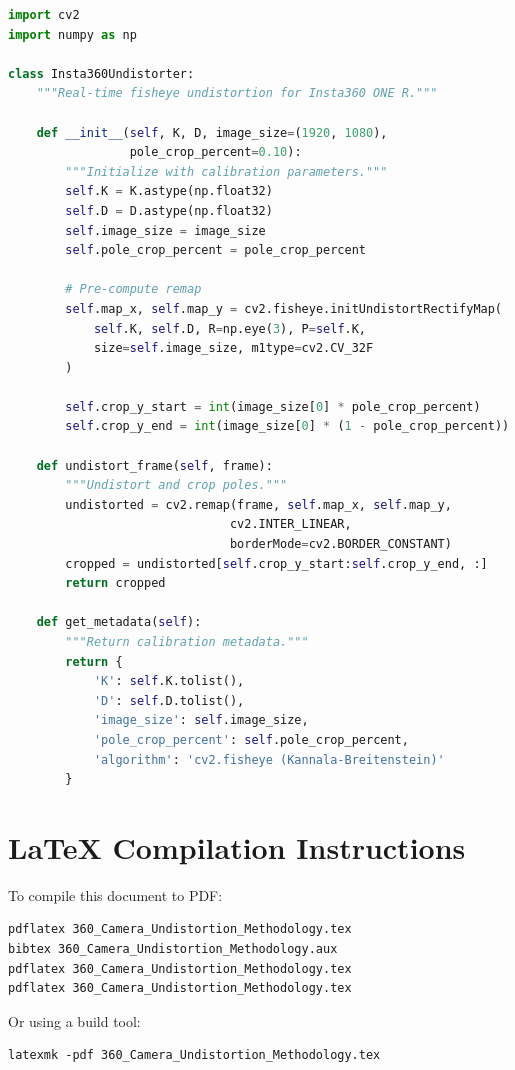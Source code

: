 \documentclass[11pt,a4paper,oneside]{article}
\begin{document}
\begin{lstlisting}[language=Python, caption=Core Undistortion Class]
import cv2
import numpy as np

class Insta360Undistorter:
    """Real-time fisheye undistortion for Insta360 ONE R."""
    
    def __init__(self, K, D, image_size=(1920, 1080), 
                 pole_crop_percent=0.10):
        """Initialize with calibration parameters."""
        self.K = K.astype(np.float32)
        self.D = D.astype(np.float32)
        self.image_size = image_size
        self.pole_crop_percent = pole_crop_percent
        
        # Pre-compute remap
        self.map_x, self.map_y = cv2.fisheye.initUndistortRectifyMap(
            self.K, self.D, R=np.eye(3), P=self.K,
            size=self.image_size, m1type=cv2.CV_32F
        )
        
        self.crop_y_start = int(image_size[0] * pole_crop_percent)
        self.crop_y_end = int(image_size[0] * (1 - pole_crop_percent))
    
    def undistort_frame(self, frame):
        """Undistort and crop poles."""
        undistorted = cv2.remap(frame, self.map_x, self.map_y,
                               cv2.INTER_LINEAR,
                               borderMode=cv2.BORDER_CONSTANT)
        cropped = undistorted[self.crop_y_start:self.crop_y_end, :]
        return cropped
    
    def get_metadata(self):
        """Return calibration metadata."""
        return {
            'K': self.K.tolist(),
            'D': self.D.tolist(),
            'image_size': self.image_size,
            'pole_crop_percent': self.pole_crop_percent,
            'algorithm': 'cv2.fisheye (Kannala-Breitenstein)'
        }
\end{lstlisting}

\section{LaTeX Compilation Instructions}

To compile this document to PDF:

\begin{verbatim}
pdflatex 360_Camera_Undistortion_Methodology.tex
bibtex 360_Camera_Undistortion_Methodology.aux
pdflatex 360_Camera_Undistortion_Methodology.tex
pdflatex 360_Camera_Undistortion_Methodology.tex
\end{verbatim}

Or using a build tool:

\begin{verbatim}
latexmk -pdf 360_Camera_Undistortion_Methodology.tex
\end{verbatim}
\end{document}
